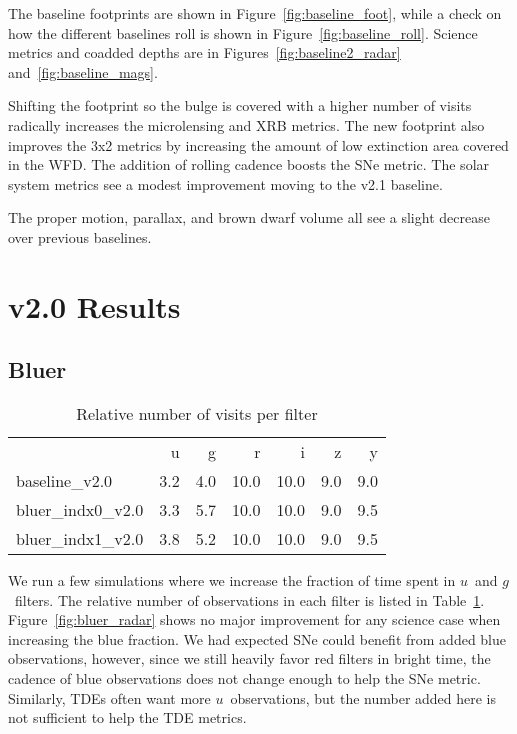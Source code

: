 The baseline footprints are shown in Figure~\ref{fig:baseline_foot}, while a check on how the different baselines roll is shown in Figure~\ref{fig:baseline_roll}. Science metrics and coadded depths are in Figures~\ref{fig:baseline2_radar} and~\ref{fig:baseline_mags}. 

Shifting the footprint so the bulge is covered with a higher number of visits radically increases the microlensing and XRB metrics. The new footprint also improves the 3x2 metrics by increasing the amount of low extinction area covered in the WFD. The addition of rolling cadence boosts the SNe metric. The solar system metrics see a modest improvement moving to the v2.1 baseline. 

The proper motion, parallax, and brown dwarf volume all see a slight decrease over previous baselines.

\section{v2.0 Results}



\subsection{Bluer}

\begin{table}
\caption{Relative number of visits per filter}
\begin{tabular}{lrrrrrr}
\toprule
{} &   u &   g &    r &    i &   z &   y \\
baseline\_v2.0    & 3.2 & 4.0 & 10.0 & 10.0 & 9.0 & 9.0 \\
bluer\_indx0\_v2.0 & 3.3 & 5.7 & 10.0 & 10.0 & 9.0 & 9.5 \\
bluer\_indx1\_v2.0 & 3.8 & 5.2 & 10.0 & 10.0 & 9.0 & 9.5 \\
\end{tabular}
\label{table:blue}
\end{table}

We run a few simulations where we increase the fraction of time spent in $u$\ and $g$\ filters. The relative number of observations in each filter is listed in Table~\ref{table:blue}. Figure~\ref{fig:bluer_radar} shows no major improvement for any science case when increasing the blue fraction. We had expected SNe could benefit from added blue observations, however, since we still heavily favor red filters in bright time, the cadence of blue observations does not change enough to help the SNe metric. Similarly, TDEs often want more $u$\ observations, but the number added here is not sufficient to help the TDE metrics.


